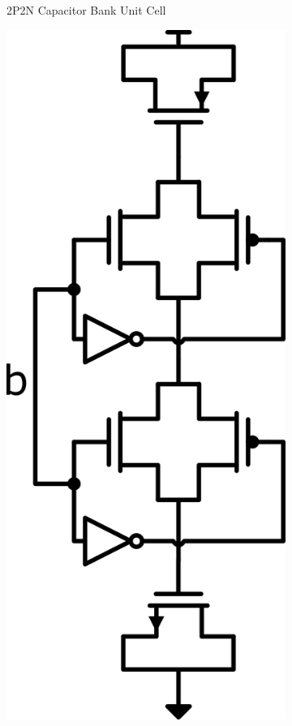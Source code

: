 \begin{figure}[htbp]
\begin{subfigure}[b]{0.1\linewidth}
    \caption{2P2N Capacitor Bank Unit Cell}
    \label{fig:2P2N_cap}
  \end{subfigure}
  \hfill
  \begin{subfigure}[b]{0.15\linewidth}
    \centering
    \includegraphics[width=\linewidth]{figures/Schematics/Tgate_cap.png}

\end{subfigure}
\end{figure}
